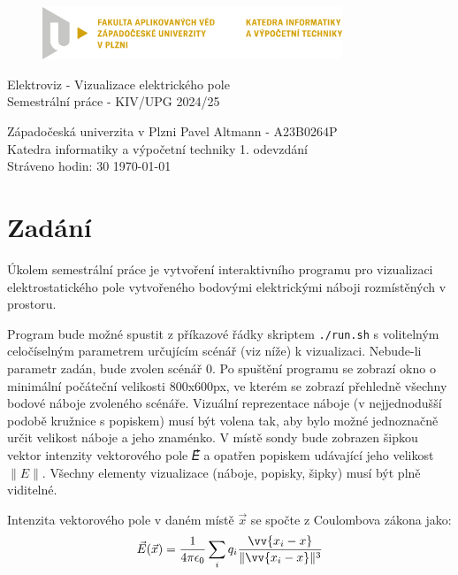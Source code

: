 \documentclass[12pt]{article}
\newcommand{\code}[1]{\mbox{\texttt{#1}}}
\begin{document}
\begin{figure}[H]
	\centering
	\includegraphics[width=0.8\textwidth]{pic/LOGO_KIV_CMYK.png}
\end{figure}

\begin{center}
	\vspace{.5cm}
	\LARGE{Elektroviz - Vizualizace elektrického pole}\\
	\small{Semestrální práce - KIV/UPG 2024/25}
\end{center}

\vfill

\noindent
Západočeská univerzita v Plzni \hfill Pavel Altmann - A23B0264P\\
Katedra informatiky a výpočetní techniky \hfill 1. odevzdání\\
Stráveno hodin: 30 \hfill \today
\thispagestyle{empty}

\newpage
\setcounter{page}{1}

\tableofcontents

\newpage

\section{Zadání}

Úkolem semestrální práce je vytvoření interaktivního programu pro vizualizaci
elektrostatického pole vytvořeného bodovými elektrickými náboji rozmístěných
v prostoru.

Program bude možné spustit z příkazové řádky skriptem \code{./run.sh} s volitelným
celočíselným parametrem určujícím scénář (viz níže) k vizualizaci. Nebude-li
parametr zadán, bude zvolen scénář 0. Po spuštění programu se zobrazí okno
o minimální počáteční velikosti 800x600px, ve kterém se zobrazí přehledně
všechny bodové náboje zvoleného scénáře. Vizuální reprezentace náboje
(v nejjednodušší podobě kružnice s popiskem) musí být volena tak, aby bylo možné
jednoznačně určit velikost náboje a jeho znaménko. V místě sondy bude zobrazen
šipkou vektor intenzity vektorového pole 𝐸⃗ a opatřen popiskem udávající jeho
velikost $\|E\|$. Všechny elementy vizualizace (náboje, popisky, šipky) musí být
plně viditelné.

Intenzita vektorového pole v daném místě $\vec{x}$ se spočte
z Coulombova zákona jako:
\[ \vec{E}(\vec{x}) = \frac{1}{4 \pi \epsilon_0}
\sum_i q_i \frac{\vv{x_i - x}}{\|\vv{x_i - x}\|^3} \]
\end{document}
